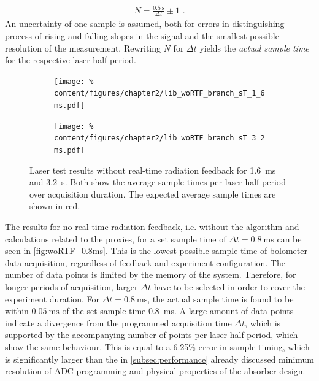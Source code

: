 %
            \begin{align}%
                N=\frac{\SI{0.5}{\second}}{\Delta t}\pm1\,\,.\nonumber%
            \end{align}%
%
            An uncertainty of one sample is assumed, both for errors in distinguishing process of rising and falling slopes in the signal and the smallest possible resolution of the measurement. Rewriting $N$ for $\Delta t$ yields the \textit{actual sample time} for the respective laser half period.\\%
%
            \begin{figure}[t]%
                \centering%
                \begin{subfigure}{0.48\textwidth}%
                    \texttt{[image: \%
                        content/figures/chapter2/lib\_woRTF\_branch\_sT\_1\_6ms.pdf]}%
                \end{subfigure}%
                \hspace*{0.25cm}%
                \begin{subfigure}{0.48\textwidth}%
                    \texttt{[image: \%
                        content/figures/chapter2/lib\_woRTF\_branch\_sT\_3\_2ms.pdf]}%
                \end{subfigure}%
                \caption{Laser test results without real-time radiation feedback for \SI{1.6}{\milli\second} and \SI{3.2}{\second}. Both show the average sample times per laser half period over acquisition duration. The expected average sample times are shown in red.}\label{fig:woRTF_1.6_3.2ms}%
            \end{figure}%
%
            The results for no real-time radiation feedback, i.e. without the algorithm and calculations related to the proxies, for a set sample time of $\Delta t=\SI{0.8}{\milli\second}$ can be seen in \cref{fig:woRTF_0.8ms}. This is the lowest possible sample time of bolometer data acquisition, regardless of feedback and experiment configuration. The number of data points is limited by the memory of the system. Therefore, for longer periods of acquisition, larger $\Delta t$ have to be selected in order to cover the experiment duration. For $\Delta t=\SI{0.8}{\milli\second}$, the actual sample time is found to be within $\SI{0.05}{\milli\second}$ of the set sample time \SI{0.8}{\milli\second}. A large amount of data points indicate a divergence from the programmed acquisition time $\Delta t$, which is supported by the accompanying number of points per laser half period, which show the same behaviour. This is equal to a 6.25\% error in sample timing, which is significantly larger than the in \cref{subsec:performance} already discussed minimum resolution of ADC programming and physical properties of the absorber design.\\%

